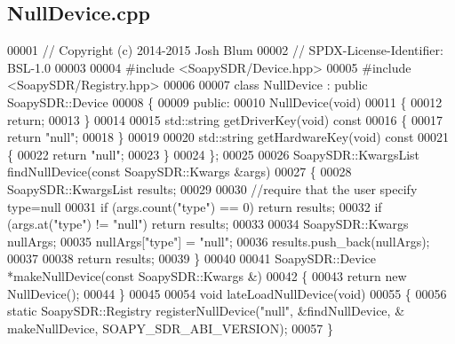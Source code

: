 \subsection{Null\+Device.\+cpp}
\label{NullDevice_8cpp_source}

\begin{DoxyCode}
00001 \textcolor{comment}{// Copyright (c) 2014-2015 Josh Blum}
00002 \textcolor{comment}{// SPDX-License-Identifier: BSL-1.0}
00003 
00004 \textcolor{preprocessor}{#include <SoapySDR/Device.hpp>}
00005 \textcolor{preprocessor}{#include <SoapySDR/Registry.hpp>}
00006 
00007 \textcolor{keyword}{class }NullDevice : \textcolor{keyword}{public} SoapySDR::Device
00008 \{
00009 \textcolor{keyword}{public}:
00010     NullDevice(\textcolor{keywordtype}{void})
00011     \{
00012         \textcolor{keywordflow}{return};
00013     \}
00014 
00015     std::string getDriverKey(\textcolor{keywordtype}{void})\textcolor{keyword}{ const}
00016 \textcolor{keyword}{    }\{
00017         \textcolor{keywordflow}{return} \textcolor{stringliteral}{"null"};
00018     \}
00019 
00020     std::string getHardwareKey(\textcolor{keywordtype}{void})\textcolor{keyword}{ const}
00021 \textcolor{keyword}{    }\{
00022         \textcolor{keywordflow}{return} \textcolor{stringliteral}{"null"};
00023     \}
00024 \};
00025 
00026 SoapySDR::KwargsList findNullDevice(\textcolor{keyword}{const} SoapySDR::Kwargs &args)
00027 \{
00028     SoapySDR::KwargsList results;
00029 
00030     \textcolor{comment}{//require that the user specify type=null}
00031     \textcolor{keywordflow}{if} (args.count(\textcolor{stringliteral}{"type"}) == 0) \textcolor{keywordflow}{return} results;
00032     \textcolor{keywordflow}{if} (args.at(\textcolor{stringliteral}{"type"}) != \textcolor{stringliteral}{"null"}) \textcolor{keywordflow}{return} results;
00033 
00034     SoapySDR::Kwargs nullArgs;
00035     nullArgs[\textcolor{stringliteral}{"type"}] = \textcolor{stringliteral}{"null"};
00036     results.push\_back(nullArgs);
00037 
00038     \textcolor{keywordflow}{return} results;
00039 \}
00040 
00041 SoapySDR::Device *makeNullDevice(\textcolor{keyword}{const} SoapySDR::Kwargs &)
00042 \{
00043     \textcolor{keywordflow}{return} \textcolor{keyword}{new} NullDevice();
00044 \}
00045 
00054 \textcolor{keywordtype}{void} lateLoadNullDevice(\textcolor{keywordtype}{void})
00055 \{
00056     \textcolor{keyword}{static} SoapySDR::Registry registerNullDevice(\textcolor{stringliteral}{"null"}, &findNullDevice, &
      makeNullDevice, SOAPY_SDR_ABI_VERSION);
00057 \}
\end{DoxyCode}
